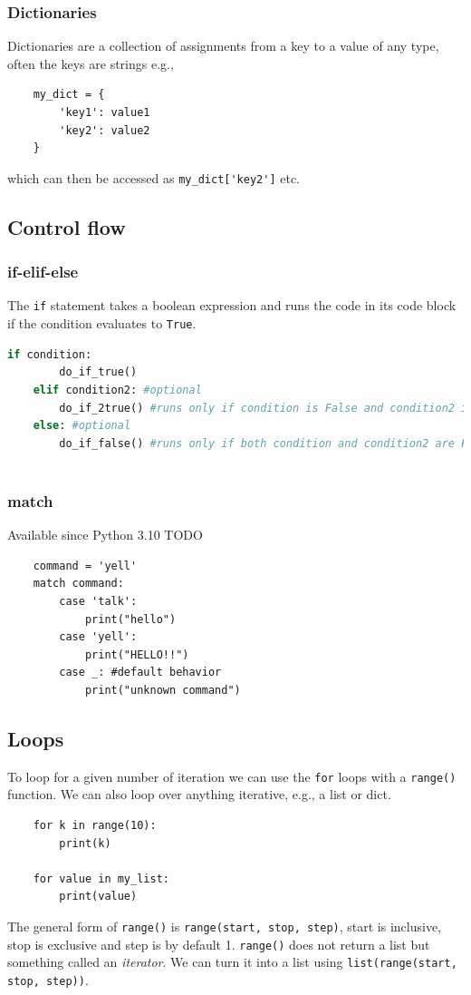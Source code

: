 \documentclass{article}
\newcommand{\ls}[1]{\lstinline{#1}}
\begin{document}
\subsubsection{Dictionaries}
Dictionaries are a collection of assignments from a key to a value of any type, often the keys are strings e.g.,
\begin{lstlisting}
    my_dict = {
        'key1': value1
        'key2': value2
    }
\end{lstlisting}
which can then be accessed as \ls{my_dict['key2']} etc.


\subsection{Control flow}

\subsubsection{if-elif-else}
The \verb|if| statement takes a boolean expression and runs the code in its code block if the condition evaluates to \verb|True|.
\begin{lstlisting}[language=Python]
    if condition:
        do_if_true()
    elif condition2: #optional
        do_if_2true() #runs only if condition is False and condition2 is True
    else: #optional
        do_if_false() #runs only if both condition and condition2 are False
        
\end{lstlisting}

\subsubsection{match}
Available since Python 3.10
TODO
\begin{lstlisting}
    command = 'yell'
    match command:
        case 'talk':
            print("hello")
        case 'yell':
            print("HELLO!!")
        case _: #default behavior
            print("unknown command")
\end{lstlisting}

\subsection{Loops}
To loop for a given number of iteration we can use the \verb|for| loops with a \verb|range()| function. We can also loop over anything iterative, e.g., a list or dict.
\begin{lstlisting}
    for k in range(10):
        print(k)

    for value in my_list:
        print(value) 
\end{lstlisting}
The general form of \ls{range()} is \ls{range(start, stop, step)}, start is inclusive, stop is exclusive and step is by default 1. \ls{range()} does not return a list but something called an \emph{iterator}. We can turn it into a list using \ls{list(range(start, stop, step))}.
\end{document}
